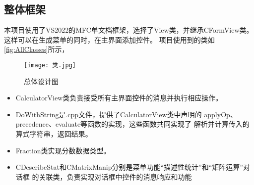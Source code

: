 \subsection{整体框架}
本项目使用了VS2022的MFC单文档框架，选择了View类，并继承CFormView类。这样可以在生成菜单的同时，在主界面添加控件。
项目使用到的类如\autoref{fig:AllClasses}所示，
\begin{figure}[!htbp]
    \centering
    \texttt{[image: 类.jpg]}
    \caption{总体设计图}
    \label{fig:AllClasses}
\end{figure}

\begin{itemize}
    \item CalculatorView类负责接受所有主界面控件的消息并执行相应操作。
    \item DoWithString是.cpp文件，提供了CalculatorView类中声明的
    applyOp、precedence、evaluate等函数的实现，这些函数共同实现了
    解析并计算传入的算式字符串，返回结果。
    \item Fraction类实现分数数据类型。
    \item CDescribeStat和CMatrixManip分别是菜单功能“描述性统计”和“矩阵运算”对话框
        的关联类，负责实现对话框中控件的消息响应和功能
\end{itemize}